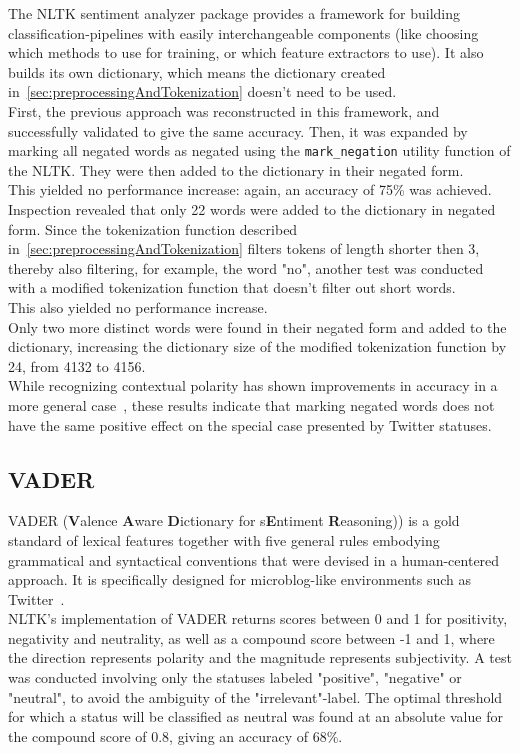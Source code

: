 The NLTK sentiment analyzer package provides a framework for building classification-pipelines with easily interchangeable components
(like choosing which methods to use for training, or which feature extractors to use).
It also builds its own dictionary, which means the dictionary created in~\autoref{sec:preprocessingAndTokenization} doesn't need to be used.
\\%
First, the previous approach was reconstructed in this framework, and successfully validated to give the same accuracy.
Then, it was expanded by marking all negated words as negated using the \texttt{mark\_negation} utility function of the NLTK.
They were then added to the dictionary in their negated form.
\\
This yielded no performance increase: again, an accuracy of 75\% was achieved.
\\
Inspection revealed that only 22 words were added to the dictionary in negated form.
Since the tokenization function described in~\autoref{sec:preprocessingAndTokenization} filters tokens of length shorter then 3,
thereby also filtering, for example, the word "no", another test was conducted with a modified tokenization function that doesn't filter out short words.
\\
This also yielded no performance increase.
\\
Only two more distinct words were found in their negated form and added to the dictionary,
increasing the dictionary size of the modified tokenization function by 24, from 4132 to 4156.
\\
While recognizing contextual polarity has shown improvements in accuracy in a more general case~\cite{Hoffmann2005},
these results indicate that marking negated words does not have the same positive effect on the special case presented by Twitter statuses.

\subsection{VADER}
\label{subsec:vader}

VADER (\textbf{V}alence \textbf{A}ware \textbf{D}ictionary for s\textbf{E}ntiment \textbf{R}easoning))
is a gold standard of lexical features together with five general rules embodying grammatical and syntactical conventions
that were devised in a human-centered approach.
It is specifically designed for microblog-like environments such as Twitter~\cite{Hutto2014}.
\\%
NLTK's implementation of VADER returns scores between 0 and 1 for positivity, negativity and neutrality,
as well as a compound score between -1 and 1, where the direction represents polarity and the magnitude represents subjectivity.
A test was conducted involving only the statuses labeled "positive", "negative" or "neutral",
to avoid the ambiguity of the "irrelevant"-label.
The optimal threshold for which a status will be classified as neutral was found
at an absolute value for the compound score of 0.8, giving an accuracy of 68\%.

